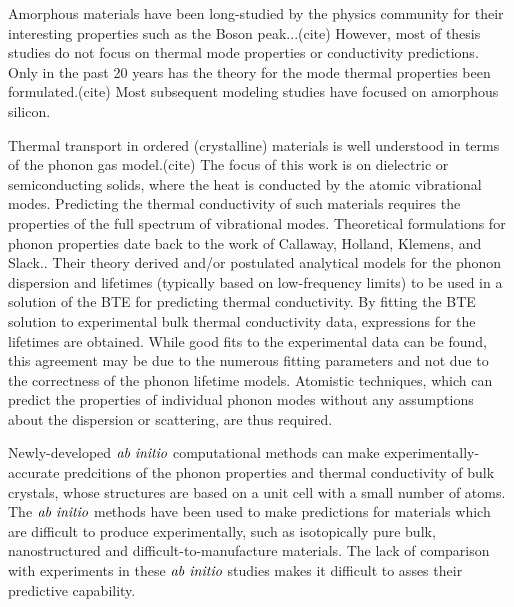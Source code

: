Amorphous materials have been long-studied by the physics community for 
their interesting properties such as the Boson peak...(cite)
However, most of thesis studies do not focus on thermal mode properties 
or conductivity predictions. 
Only in the past 20 years has the theory for the mode 
thermal properties been formulated.(cite) Most subsequent modeling 
studies have focused on amorphous silicon.



Thermal transport in ordered (crystalline) materials is well understood 
in terms of the phonon gas model.(cite) 
The focus of this work is on dielectric or semiconducting solids,  
where the heat is conducted by the atomic vibrational modes. 
Predicting the thermal conductivity of such materials 
requires the properties of the full spectrum of vibrational modes.
\cite{ziman_electrons_2001,feldman_thermal_1993,allen_diffusons_1999} 
Theoretical formulations for phonon properties date back to the work of 
Callaway,\cite{callaway_model_1959} 
Holland,
\cite{holland_analysis_1963} 
Klemens,\cite{klemens_scattering_1955} 
and Slack.\cite{slack_thermal_1979}. Their theory derived and/or 
postulated analytical models for the phonon dispersion and lifetimes 
(typically based on low-frequency limits) to be used in a solution 
of the BTE for predicting thermal conductivity. By fitting the
BTE solution to experimental bulk thermal conductivity data, expressions 
for the lifetimes are obtained. While good fits to the experimental 
data can be found, this agreement may be due to the numerous fitting 
parameters and not due to the correctness of the phonon lifetime models.
\cite{chung_role_2004} 
Atomistic techniques, which can predict the properties of individual phonon
modes without any assumptions about the dispersion or scattering, 
are thus required.

Newly-developed $\emph{ab initio}$ 
computational methods can make experimentally-accurate predcitions 
of the phonon properties and thermal conductivity of bulk crystals, 
whose structures are based on a unit cell with a small number of 
atoms.
\cite{broido_inrinsic_2007,ward_ab_initio_2009,intrinsic_ward_2010,
li_thermal_2012,lindsay_thermal_2012,lindsay_first-principles_2013}
The $\emph{ab initio}$ methods have been used to make predictions 
for materials which are 
difficult to produce experimentally, such as isotopically 
pure bulk,\cite{lindsay_thermal_2012} 
nanostructured\cite{kundu_light_2011,li_thermal_2012}
and difficult-to-manufacture 
materials.\cite{kundu_light_2011,lindsay_first-principles_2013} 
The lack of comparison with experiments 
in these $\emph{ab initio}$ 
studies makes it difficult to asses their predictive capability.
\cite{kundu_light_2011,lindsay_first-principles_2013} 

